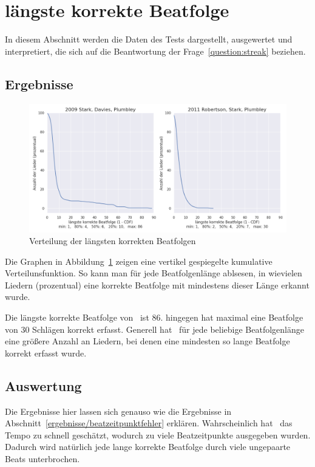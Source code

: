 \section{längste korrekte Beatfolge}
{
	In diesem Abschnitt werden die Daten des Tests dargestellt, ausgewertet und interpretiert,
		die sich auf die Beantwortung der Frage~\ref{question:streak} beziehen.

	\subsection{Ergebnisse}
	{
		\begin{figure}[h]
			\centering
			\includegraphics[scale=0.47]{resources/longest_streak.png}
			\caption{Verteilung der längsten korrekten Beatfolgen}
			\label{fig:longest_streak}
		\end{figure}

		Die Graphen in Abbildung~\ref{fig:longest_streak} zeigen eine vertikel gespiegelte kumulative Verteilunsfunktion.
		So kann man für jede Beatfolgenlänge ablsesen,
			in wievielen Liedern (prozentual) eine korrekte Beatfolge mit mindestens dieser Länge erkannt wurde.

		Die längste korrekte Beatfolge von~\cite{2009_DaPlSt} ist \num{86}.
		\cite{2011_PlRoSt} hingegen hat maximal eine  Beatfolge von \num{30} Schlägen korrekt erfasst.
		Generell hat~\cite{2009_DaPlSt} für jede beliebige Beatfolgenlänge eine grö{\ss}ere Anzahl an Liedern,
			bei denen eine mindesten so lange Beatfolge korrekt erfasst wurde.
	}

	\subsection{Auswertung}
	{
		Die Ergebnisse hier lassen sich genauso wie die Ergebnisse in Abschnitt~\ref{ergebnisse/beatzeitpunktfehler} erklären.
		Wahrscheinlich hat~\cite{2011_PlRoSt} das Tempo zu schnell geschätzt,
			wodurch zu viele Beatzeitpunkte ausgegeben wurden.
		Dadurch wird natürlich jede lange korrekte Beatfolge durch viele ungepaarte Beats unterbrochen.
	}

}

